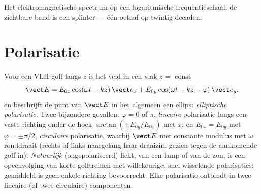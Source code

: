 \begin{omfigure}

{\small Het elektromagnetische spectrum op een logaritmische
frequentieschaal; de zichtbare band is een splinter --- één octaaf op
twintig decaden.}
\end{omfigure}

\section{Polarisatie}

\begin{definition}[Polarisatietoestanden]\label{def:b2:plane-waves-polarization:states}
Voor een VLH-golf langs $z$ is het veld in een vlak $z = $ const
\[
\vect E = E_{0x}\cos(\omega t - kz)\,\vect e_x + E_{0y}\cos(\omega t - kz - \varphi)\,\vect e_y ,
\]
en beschrijft de punt van $\vect E$ in het algemeen een ellips:
\emph{elliptische polarisatie}. Twee bijzondere gevallen: $\varphi = 0$ of
$\pi$, \emph{lineaire} polarisatie langs een vaste richting onder de hoek
$\arctan(\pm E_{0y}/E_{0x})$ met $x$; en $E_{0x} = E_{0y}$ met
$\varphi = \pm\pi/2$, \emph{circulaire} polarisatie, waarbij $\vect E$ met
constante modulus met $\omega$ ronddraait (rechts of links naargelang haar
draaizin, gezien tegen de aankomende golf in). \emph{Natuurlijk}
(ongepolariseerd) licht, van een lamp of van de zon, is een opeenvolging van
korte golftreinen met willekeurige, snel wisselende polarisaties: gemiddeld
is geen enkele richting bevoorrecht. Elke polarisatie ontbindt in twee
lineaire (of twee circulaire) componenten.
\end{definition}

